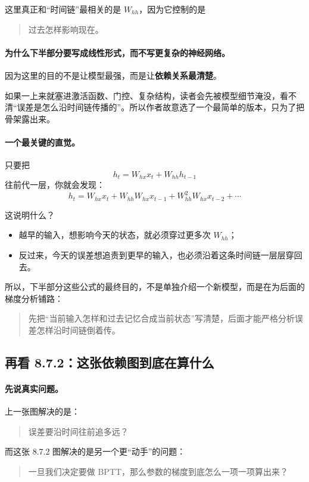 \documentclass[12pt,a4paper]{ctexart}
\begin{document}
这里真正和“时间链”最相关的是 \(W_{hh}\)，因为它控制的是
\begin{quote}
过去怎样影响现在。
\end{quote}

\paragraph{为什么下半部分要写成线性形式，而不写更复杂的神经网络。}
因为这里的目的不是让模型最强，而是让\textbf{依赖关系最清楚}。

如果一上来就塞进激活函数、门控、复杂结构，读者会先被模型细节淹没，看不清“误差是怎么沿时间链传播的”。所以作者故意选了一个最简单的版本，只为了把骨架露出来。

\paragraph{一个最关键的直觉。}
只要把
\[
h_t = W_{hx}x_t + W_{hh}h_{t-1}
\]
往前代一层，你就会发现：
\[
h_t
=
W_{hx}x_t
+
W_{hh}W_{hx}x_{t-1}
+
W_{hh}^2W_{hx}x_{t-2}
+
\cdots
\]

这说明什么？
\begin{itemize}
  \item 越早的输入，想影响今天的状态，就必须穿过更多次 \(W_{hh}\)；
  \item 反过来，今天的误差想追责到更早的输入，也必须沿着这条时间链一层层穿回去。
\end{itemize}

所以，下半部分这些公式的最终目的，不是单独介绍一个新模型，而是在为后面的梯度分析铺路：
\begin{quote}
先把“当前输入怎样和过去记忆合成当前状态”写清楚，后面才能严格分析误差怎样沿时间链倒着传。
\end{quote}

\subsection{再看 8.7.2：这张依赖图到底在算什么}

\paragraph{先说真实问题。}
上一张图解决的是：
\begin{quote}
误差要沿时间往前追多远？
\end{quote}

而这张 8.7.2 图解决的是另一个更“动手”的问题：
\begin{quote}
一旦我们决定要做 BPTT，那么参数的梯度到底怎么一项一项算出来？
\end{quote}
\end{document}

